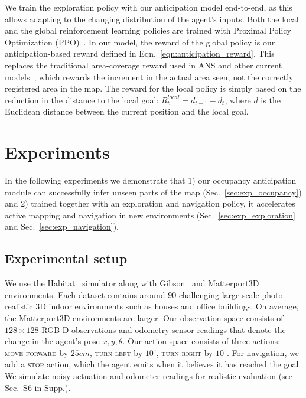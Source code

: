 \documentclass[runningheads]{llncs}
\begin{document}
We train the exploration policy with our anticipation model end-to-end, as this allows adapting to the changing distribution of the agent's inputs. Both the local and the global reinforcement learning policies are trained with Proximal Policy Optimization (PPO)~\cite{schulman2017proximal}. In our model, the reward of the global policy is our anticipation-based reward defined in Eqn.~\ref{eqn:anticipation_reward}.  This replaces the traditional area-coverage reward used in ANS and other current models~\cite{chen2019learning,chaplot2020learning,ramakrishnan2020exploration}, which rewards the increment in the actual area seen, not the correctly registered area in the map. The reward for the local policy is simply based on the reduction in the distance to the local goal:  $R_{t}^{local} = d_{t-1} - d_{t}$,  where $d$ is the Euclidean distance between the current position and the local goal.  \section{Experiments}

In the following experiments we demonstrate that 1) our occupancy anticipation module can successfully infer unseen parts of the map (Sec.~\ref{sec:exp_occupancy}) and 2) trained together with an exploration and navigation policy, it accelerates active mapping and navigation in new environments (Sec.~\ref{sec:exp_exploration} and Sec.~\ref{sec:exp_navigation}).

\subsection{Experimental setup}
\label{sec:exp_setup}

We use the Habitat~\cite{habitat19iccv} simulator along with Gibson~\cite{xia2018gibson} and Matterport3D~\cite{chang2017matterport} environments. Each dataset contains around $90$ challenging large-scale photo-realistic 3D indoor environments such as houses and office buildings.  On average, the Matterport3D environments are larger. Our observation space consists of $128 \times 128$ RGB-D observations and odometry sensor readings that denote the change in the agent's pose $x, y, \theta$. Our action space consists of three actions: \textsc{move-forward} by $25\si{cm}$, \textsc{turn-left} by $10^{\circ}$, \textsc{turn-right} by $10^{\circ}$. For navigation, we add a \textsc{stop} action, which the agent emits when it believes it has reached the goal. We simulate noisy actuation and odometer readings for realistic evaluation (see Sec.~S6 in Supp.).
\end{document}
